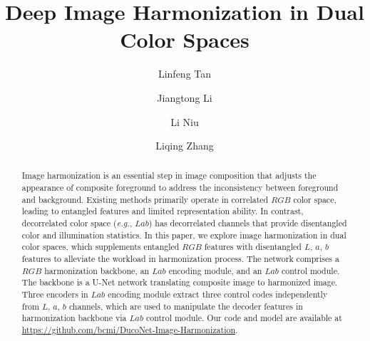 \documentclass[sigconf]{acmart}
\begin{document}
\title{Deep Image Harmonization in Dual Color Spaces}

\author{Linfeng Tan}

\author{Jiangtong Li}

\author{Li Niu}

\author{Liqing Zhang}
\authornotemark[1]

\begin{abstract}

Image harmonization is an essential step in image composition that adjusts the appearance of composite foreground to address the inconsistency between foreground and background. 
Existing methods primarily operate in correlated $RGB$ color space, leading to entangled features and limited representation ability. 
In contrast, decorrelated color space (\emph{e.g.}, $Lab$) has decorrelated channels that provide disentangled color and illumination statistics. 
In this paper, we explore image harmonization in dual color spaces, which supplements entangled $RGB$ features with disentangled $L$, $a$, $b$ features to alleviate the workload in harmonization process. 
The network comprises a $RGB$ harmonization backbone, an $Lab$ encoding module, and an $Lab$ control module. 
The backbone is a U-Net network translating composite image to harmonized image. Three encoders in $Lab$ encoding module extract three control codes independently from $L$, $a$, $b$ channels, which are used to manipulate the decoder features in harmonization backbone via $Lab$ control module. 
Our code and model are available at \href{https://github.com/bcmi/DucoNet-Image-Harmonization}{https://github.com/bcmi/DucoNet-Image-Harmonization}.

\end{abstract}
\end{document}
